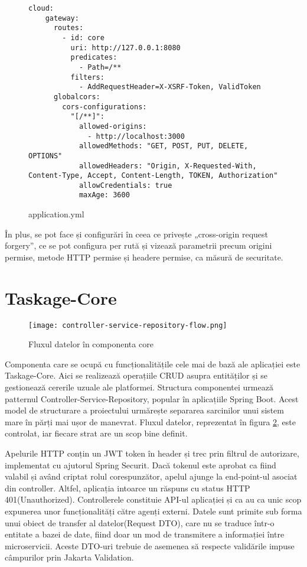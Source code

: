 \begin{figure}[H]
	\begin{lstlisting}[frame=single, style=yaml]
  cloud:
    gateway:
      routes:
        - id: core
          uri: http://127.0.0.1:8080
          predicates:
            - Path=/**
          filters:
            - AddRequestHeader=X-XSRF-Token, ValidToken
      globalcors:
        cors-configurations:
          "[/**]":
            allowed-origins:
              - http://localhost:3000
            allowedMethods: "GET, POST, PUT, DELETE, OPTIONS"
            allowedHeaders: "Origin, X-Requested-With, Content-Type, Accept, Content-Length, TOKEN, Authorization"
            allowCredentials: true
            maxAge: 3600
	\end{lstlisting}
	\caption{application.yml}
	\label{fig:yaml}
\end{figure}

În plus, se pot face și configurări în ceea ce privește „cross-origin request forgery”, ce se pot configura per rută și vizează parametrii precum origini permise, metode HTTP permise și headere permise, ca măsură de securitate.

\section{Taskage-Core}

 \begin{figure}[ht]
	\centering
 	 \texttt{[image: controller-service-repository-flow.png]}
	\caption{Fluxul datelor în componenta core}
	\label{controller-service-repository-flow}
 \end{figure}

Componenta care se ocupă cu funcționalitățile cele mai de bază ale aplicației este Taskage-Core. Aici se realizează operațiile CRUD asupra entităților și se gestionează cererile uzuale ale platformei. Structura componentei urmează patternul Controller-Service-Repository, popular în aplicațiile Spring Boot. Acest model de structurare a proiectului urmărește separarea sarcinilor unui sistem mare în părți mai ușor de manevrat. Fluxul datelor, reprezentat în figura \ref{controller-service-repository-flow}, este controlat, iar fiecare strat are un scop bine definit. 

Apelurile HTTP conțin un JWT token în header și trec prin filtrul de autorizare, implementat cu ajutorul Spring Securit. Dacă tokenul este aprobat ca fiind valabil și având criptat rolul corespunzător, apelul ajunge la end-point-ul asociat din controller. Altfel, aplicația intoarce un răspuns cu status HTTP 401(Unauthorized). Controllerele constituie API-ul aplicației și ca au ca unic scop expunerea unor funcționalități către agenți externi. Datele sunt primite sub forma unui obiect de transfer al datelor(Request DTO), care nu se traduce într-o entitate a bazei de date, fiind doar un mod de transmitere a informației între microservicii. Aceste DTO-uri trebuie de asemenea să respecte validările impuse câmpurilor prin Jakarta Validation.

